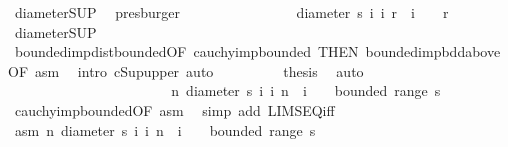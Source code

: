 \begin{isabellebody}
\ diameter{\isacharunderscore}{\kern0pt}SUP\ \isamarkupfalse%
\ presburger\isanewline
\ \ \ \ \ \ \isacommand{{\isacharbraceright}{\kern0pt}}\isamarkupfalse%
\isanewline
\ \ \ \ \ \ \isamarkupfalse%
\ \isamarkupfalse%
\ {\isachardoublequoteopen}diameter\ {\isacharbraceleft}{\kern0pt}s\ i\ {\isacharbar}{\kern0pt}i{\isachardot}{\kern0pt}\ r\ {\isasymle}\ i{\isacharbraceright}{\kern0pt}\ {\isasymge}\ {}{\isachardoublequoteclose}\ \ r\ \isamarkupfalse%
\ diameter{\isacharunderscore}{\kern0pt}SUP\ \isamarkupfalse%
\ bounded{\isacharunderscore}{\kern0pt}imp{\isacharunderscore}{\kern0pt}dist{\isacharunderscore}{\kern0pt}bounded{\isacharbrackleft}{\kern0pt}OF\ cauchy{\isacharunderscore}{\kern0pt}imp{\isacharunderscore}{\kern0pt}bounded{\isacharcomma}{\kern0pt}\ THEN\ bounded{\isacharunderscore}{\kern0pt}imp{\isacharunderscore}{\kern0pt}bdd{\isacharunderscore}{\kern0pt}above{\isacharcomma}{\kern0pt}\ OF\ asm{\isacharbrackright}{\kern0pt}\ \isamarkupfalse%
\ {\isacharparenleft}{\kern0pt}intro\ cSup{\isacharunderscore}{\kern0pt}upper{}{\isacharcomma}{\kern0pt}\ auto{\isacharparenright}{\kern0pt}\isanewline
\ \ \ \ \ \ \isamarkupfalse%
\ \isamarkupfalse%
\ {\isacharquery}{\kern0pt}thesis\ \isamarkupfalse%
\ auto\isanewline
\ \ \ \ \isamarkupfalse%
\ \ \ \ \ \ \ \ \ \ \ \ \ \ \ \ \ \isanewline
\ \ \ \ \isamarkupfalse%
\ {\isachardoublequoteopen}{\isacharparenleft}{\kern0pt}{\isasymlambda}n{\isachardot}{\kern0pt}\ diameter\ {\isacharbraceleft}{\kern0pt}s\ i\ {\isacharbar}{\kern0pt}i{\isachardot}{\kern0pt}\ n\ {\isasymle}\ i{\isacharbraceright}{\kern0pt}{\isacharparenright}{\kern0pt}\ {\isasymlonglonglongrightarrow}\ {}\ {\isasymand}\ bounded\ {\isacharparenleft}{\kern0pt}range\ s{\isacharparenright}{\kern0pt}{\isachardoublequoteclose}\ \isamarkupfalse%
\ cauchy{\isacharunderscore}{\kern0pt}imp{\isacharunderscore}{\kern0pt}bounded{\isacharbrackleft}{\kern0pt}OF\ asm{\isacharbrackright}{\kern0pt}\ \isamarkupfalse%
\ {\isacharparenleft}{\kern0pt}simp\ add{\isacharcolon}{\kern0pt}\ LIMSEQ{\isacharunderscore}{\kern0pt}iff{\isacharparenright}{\kern0pt}\isanewline
\ \ \isamarkupfalse%
\isanewline
\ \ \ \ \isamarkupfalse%
\ asm{\isacharcolon}{\kern0pt}\ {\isachardoublequoteopen}{\isacharparenleft}{\kern0pt}{\isasymlambda}n{\isachardot}{\kern0pt}\ diameter\ {\isacharbraceleft}{\kern0pt}s\ i\ {\isacharbar}{\kern0pt}i{\isachardot}{\kern0pt}\ n\ {\isasymle}\ i{\isacharbraceright}{\kern0pt}{\isacharparenright}{\kern0pt}\ {\isasymlonglonglongrightarrow}\ {}\ {\isasymand}\ bounded\ {\isacharparenleft}{\kern0pt}range\ s{\isacharparenright}{\kern0pt}{\isachardoublequoteclose}\isanewline

\end{isabellebody}
